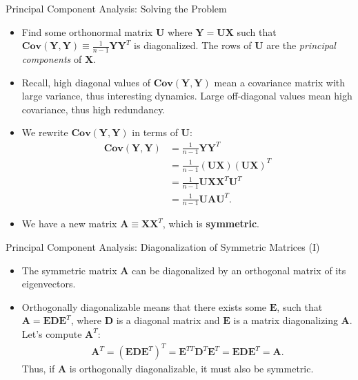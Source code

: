 \begin{frame}{Principal Component Analysis: Solving the Problem}
	\begin{itemize}
		\item Find some orthonormal matrix $\mathbf{U}$ where 
		$\mathbf{Y}=\mathbf{U}\mathbf{X}$ such that 
		$\mathbf{Cov}(\mathbf{Y},\mathbf{Y}) \equiv \frac{1}{n-1} 
		\mathbf{Y}\mathbf{Y}^T$ is diagonalized. The rows of $\mathbf{U}$ are 
		the \emph{principal components} of $\mathbf{X}$.
		\item Recall, high diagonal values of 
		$\mathbf{Cov}(\mathbf{Y},\mathbf{Y})$ mean a covariance matrix with 
		large variance, thus interesting dynamics. Large off-diagonal values 
		mean high covariance, thus high redundancy.
		\item We rewrite $\mathbf{Cov}(\mathbf{Y},\mathbf{Y})$ in terms of 
		$\mathbf{U}$:
		\begin{align}
			\mathbf{Cov}(\mathbf{Y},\mathbf{Y}) & = \frac{1}{n-1} 
			\mathbf{Y}\mathbf{Y}^T                         \\
			& = \frac{1}{n-1} (\mathbf{U}\mathbf{X})(\mathbf{U}\mathbf{X})^T \\
			& = \frac{1}{n-1} \mathbf{U}\mathbf{X}\mathbf{X}^T\mathbf{U}^T   \\
			& = \frac{1}{n-1} \mathbf{U}\mathbf{A}\mathbf{U}^T.              
		\end{align}
		\item We have a new matrix $\mathbf{A} \equiv \mathbf{X}\mathbf{X}^T$, 
		which is \textbf{symmetric}.
	\end{itemize}
\end{frame}

\begin{frame}{Principal Component Analysis: Diagonalization of Symmetric 
Matrices (I)}
	\begin{itemize}
		\item The symmetric matrix $\mathbf{A}$ can be diagonalized by an 
		orthogonal matrix of its eigenvectors.
		\item Orthogonally diagonalizable means that there exists some 
		$\mathbf{E}$, such that $\mathbf{A} = 
		\mathbf{E}\mathbf{D}\mathbf{E}^T$, where $\mathbf{D}$ is a diagonal 
		matrix and $\mathbf{E}$ is a matrix diagonalizing $\mathbf{A}$. Let's 
		compute $\mathbf{A}^T$:
		\begin{align}
			\mathbf{A}^T = (\mathbf{E}\mathbf{D}\mathbf{E}^T)^T = 
			\mathbf{E}^{TT}\mathbf{D}^T\mathbf{E}^T = \mathbf{EDE}^T = 
			\mathbf{A}. 
		\end{align}
		Thus, if $\mathbf{A}$ is orthogonally diagonalizable, it must also be 
		symmetric.
	\end{itemize}
\end{frame}

